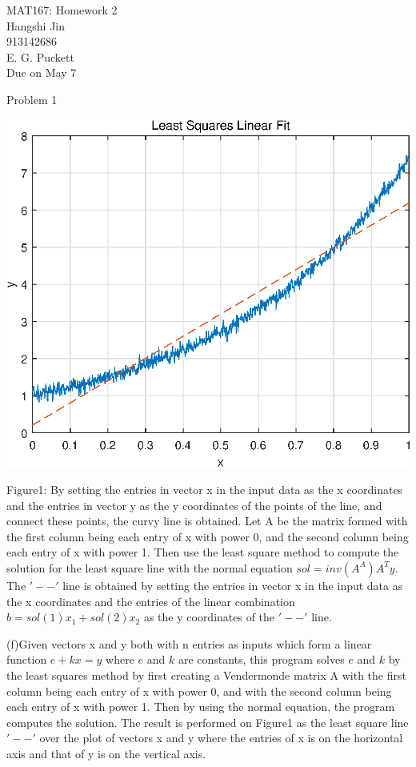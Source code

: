 \documentclass{article}
\begin{document}
\begin{flushright}MAT167: Homework 2\\ Hangshi Jin \\913142686\\ E. G. Puckett\\Due on May 7
\end{flushright}
\begin{large}Problem 1\end{large}
\begin{center}
   \includegraphics[scale=1]{Figure1.eps}
   \begin{center}Figure1: By setting the entries in vector x in the input data as the x coordinates and the entries in vector y as the y coordinates of the points of the line, and connect these points, the curvy line is obtained. Let A be the matrix formed with the first column being each entry of x with power 0, and the second column being each entry of x with power 1. Then use the least square method to compute the solution for the least square line with the normal equation $sol=inv(A^A)A^Ty$. The  $'--'$ line is obtained by setting the entries in vector x in the input data as the x coordinates and the entries of the linear combination $b=sol(1)x_1+sol(2)x_2$ as the y coordinates of the $'--'$ line.\end{center}\end{center}
(f)Given vectors x and y both with n entries as inputs which form a linear function $e+kx=y$ where $e$ and $k$ are constants, this program solves $e$ and $k$ by the least squares method by first creating a Vendermonde matrix A with the first column being each entry of x with power 0, and with the second column being each entry of x with power 1. Then by using the normal equation, the program computes the solution. The result is performed on Figure1 as the least square line $'--'$ over the plot of vectors x and y where the entries of x is on the horizontal axis and that of y is on the vertical axis.
\end{document}
